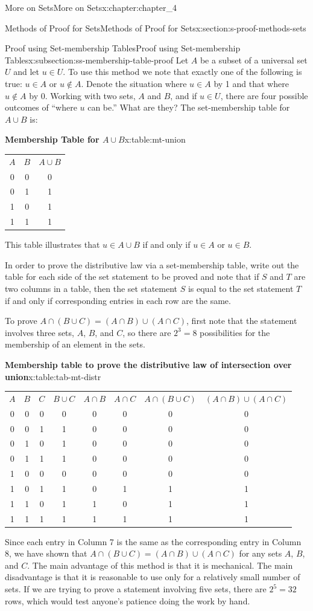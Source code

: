 \documentclass[oneside,10pt,]{book}
\newcommand{\tabularfont}{\relax}
\begin{document}
\begin{chapterptx}{More on Sets}{}{More on Sets}{}{}{x:chapter:chapter_4}
\begin{sectionptx}{Methods of Proof for Sets}{}{Methods of Proof for Sets}{}{}{x:section:s-proof-methods-sets}
\begin{subsectionptx}{Proof using Set-membership Tables}{}{Proof using Set-membership Tables}{}{}{x:subsection:ss-membership-table-proof}
Let \(A\) be a subset of a universal set \(U\) and let \(u\in U\). To use this method we note that exactly one of the following is true: \(u \in  A\) or \(u\notin  A\). Denote the situation where \(u \in  A\) by 1 and that where \(u \notin  A\) by 0. Working with two sets, \(A\) and \(B\), and if \(u \in  U\), there are four possible outcomes of ``where \(u\) can be.'' What are they? The set-membership table for \(A \cup  B\) is:%
\begin{tableptx}{\textbf{Membership Table for \(A \cup  B\)}}{x:table:mt-union}{}%
\centering
{\tabularfont%
\begin{tabular}{ccc}
\(A\)&\(B\)&\(A \cup  B\)\tabularnewline[0pt]
0&0&0\tabularnewline[0pt]
0&1&1\tabularnewline[0pt]
1&0&1\tabularnewline[0pt]
1&1&1
\end{tabular}
}%
\end{tableptx}%
This table illustrates that \(u\in A \cup  B\) if and only if \(u\in A\) or \(u \in  B\).%
\par
In order to prove the distributive law via a set-membership table, write out the table for each side of the set statement to be proved and note that if \(S\) and \(T\) are two columns in a table, then the set statement \(S\) is equal to the set statement \(T\) if and only if corresponding entries in each row are the same.%
\par
To prove \(A \cap  (B \cup  C) = (A \cap  B) \cup  (A \cap  C)\), first note that the statement involves three sets, \(A\), \(B\), and \(C\), so there are \(2^3= 8\) possibilities for the membership of an element in the sets.%
\begin{tableptx}{\textbf{Membership table to prove the distributive law of intersection over union}}{x:table:tab-mt-distr}{}%
\centering
{\tabularfont%
\begin{tabular}{cccccccc}
\(A\)&\(B\)&\(C\)&\(B \cup  C\)&\(A \cap B\)&\(A \cap C\)&\(A \cap  (B \cup  C)\)&\((A \cap  B) \cup  (A \cap  C)\)\tabularnewline[0pt]
0&0&0&0&0&0&0&0\tabularnewline[0pt]
0&0&1&1&0&0&0&0\tabularnewline[0pt]
0&1&0&1&0&0&0&0\tabularnewline[0pt]
0&1&1&1&0&0&0&0\tabularnewline[0pt]
1&0&0&0&0&0&0&0\tabularnewline[0pt]
1&0&1&1&0&1&1&1\tabularnewline[0pt]
1&1&0&1&1&0&1&1\tabularnewline[0pt]
1&1&1&1&1&1&1&1
\end{tabular}
}%
\end{tableptx}%
Since each entry in Column 7 is the same as the corresponding entry in Column 8, we have shown that \(A\cap  (B \cup  C) = (A\cap B) \cup  (A \cap C)\) for any sets \(A\), \(B\), and \(C\). The main advantage of this method is that it is mechanical. The main disadvantage is that it is reasonable to use only for a relatively small number of sets. If we are trying to prove a statement involving five sets, there are \(2^5 = 32\) rows, which would test anyone's patience doing the work by hand.%

\end{subsectionptx}
\end{sectionptx}
\end{chapterptx}
\end{document}
